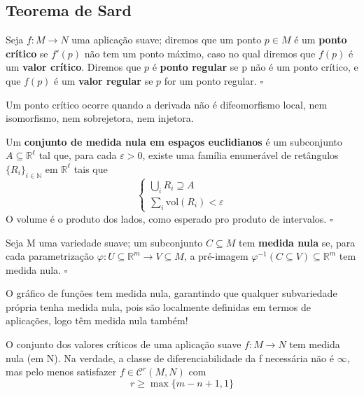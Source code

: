 \documentclass[../differential_topology.tex]{subfiles}
\begin{document}
\subsection{Teorema de Sard}
\begin{def*}
	Seja \(f:M\rightarrow N\) uma aplicação suave; diremos que um ponto \(p\in M\) é um \textbf{ponto crítico} se \(f'(p)\) não tem um ponto máximo, caso no qual diremos que \(f(p)\) é um \textbf{valor crítico}.
	Diremos que \(p\) é \textbf{ponto regular} se p não é um ponto crítico, e que \(f(p)\) é um \textbf{valor regular} se \(p\) for um ponto regular. \(\square\)
\end{def*}
Um ponto crítico ocorre quando a derivada não é difeomorfismo local, nem isomorfismo, nem sobrejetora, nem injetora.
\begin{def*}
	Um \textbf{conjunto de medida nula em espaços euclidianos} é um subconjunto \(A\subseteq \mathbb{R}^{\ell }\) tal que, para cada \(\varepsilon > 0\), existe uma família enumerável de retângulos \(\{R_{i}\}_{i\in \mathbb{N}}\) em \(\mathbb{R}^{\ell }\) tais que
	\[
		\left\{\begin{array}{ll}
			\bigcup_{i}^{}R_{i} \supseteq A \\
			\sum\limits_{i}^{}\mathrm{vol}(R_{i}) < \varepsilon
		\end{array}\right.
	\]
	O volume é o produto dos lados, como esperado pro produto de intervalos. \(\square\)
\end{def*}
\begin{def*}
	Seja M uma variedade suave; um subconjunto \(C\subseteq M\) tem \textbf{medida nula} se, para cada parametrização \(\varphi :U\subseteq \mathbb{R}^{m}\rightarrow V\subseteq M\), a pré-imagem \(\varphi^{-1}(C\subseteq V)\subseteq \mathbb{R}^{m}\) tem medida nula. \(\square\)
\end{def*}
O gráfico de funções tem medida nula, garantindo que qualquer subvariedade própria tenha medida nula, pois são localmente definidas em termos de aplicações, logo têm medida nula também!

\hypertarget{sard_theorem}{
	\begin{theorem*}
		O conjunto dos valores críticos de uma aplicação suave \(f:M\rightarrow N\) tem medida nula (em N).
		Na verdade, a classe de diferenciabilidade da f necessária não é \(\infty\), mas pelo menos satisfazer \(f\in \mathcal{C}^{r}(M, N)\) com
		\[
			r\geq \max\limits\{m-n+1, 1\}
		\]
	\end{theorem*}
}
\end{document}
